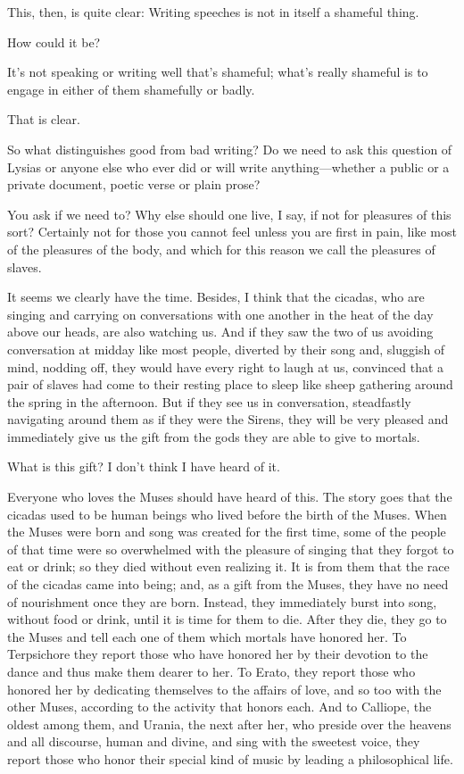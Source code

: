 \saysocrates This, then, is quite clear: Writing speeches is not in itself
a shameful thing.

\sayphaedrus How could it be?

\saysocrates It’s not speaking or writing well that’s shameful; what’s
really shameful is to engage in either of them shamefully or badly.

\sayphaedrus That is clear.

\saysocrates So what distinguishes good from bad writing? Do we need to ask
this question of Lysias or anyone else who ever did or will write
anything---whether a public or a private document, poetic verse or plain
prose?

\sayphaedrus You ask if we need to? Why else should one live, I say, if 
not for pleasures of this sort? Certainly not for those you
cannot feel unless you are first in pain, like most of the pleasures of
the body, and which for this reason we call the pleasures of slaves.

\saysocrates It seems we clearly have the time. Besides, I think that the
cicadas, who are singing and carrying on conversations with one another 
in the heat of the day above our heads, are also
watching us. And if they saw the two of us avoiding conversation at
midday like most people, diverted by their song and, sluggish of mind,
nodding off, they would have every right to laugh at us, convinced that
a pair of slaves had come to their resting place to sleep like sheep
gathering around the spring in the afternoon. But if they see us in
conversation, steadfastly navigating around them as if they were
the Sirens, they will be very pleased and immediately give us the gift
from the gods they are able to give to mortals.

\sayphaedrus What is this gift? I don’t think I have heard of it.

\saysocrates Everyone who loves the Muses should have heard of this. The
story goes that the cicadas used to be human beings who lived before the
birth of the Muses. When the Muses were born and song was created for
the first time, some of the people of that time were so overwhelmed 
with the pleasure of singing that they forgot to eat or drink;
so they died without even realizing it. It is from them that the race of
the cicadas came into being; and, as a gift from the Muses, they have no
need of nourishment once they are born. Instead, they immediately burst
into song, without food or drink, until it is time for them to die.
After they die, they go to the Muses and tell each one of them which
mortals have honored her. To Terpsichore they report those who
have honored her by their devotion to the dance and thus make them
dearer to her. To Erato, they report those who honored her by dedicating
themselves to the affairs of love, and so too with the other Muses,
according to the activity that honors each. And to Calliope, the oldest
among them, and Urania, the next after her, who preside over the heavens
and all discourse, human and divine, and sing with the sweetest voice,
they report those who honor their special kind of music by leading a
philosophical life.

